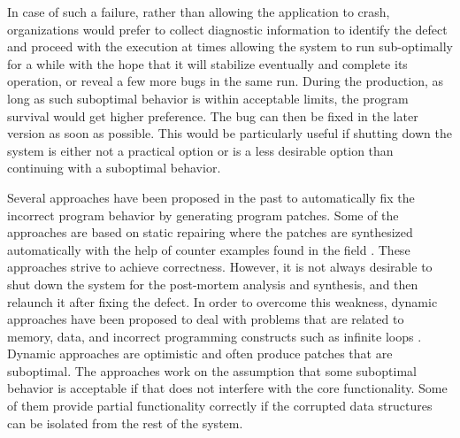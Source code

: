 In case of such a failure, rather than allowing the application to crash, organizations would
prefer to collect diagnostic information to identify the defect and proceed with the execution at times
allowing the system to run sub-optimally for a while with the hope that it will stabilize eventually and complete its operation, or 
reveal a few more bugs in the same run. During the production, as long as such suboptimal
behavior is within acceptable limits, the program survival would get higher preference. The bug can then be
fixed in the later version as soon as possible. This would be particularly useful if shutting down the system is
either not a practical option or is a less desirable option than continuing with a suboptimal behavior.


Several approaches have been proposed in the past to automatically fix the incorrect program behavior by generating program patches.
Some of the approaches are based on static repairing
where the patches are synthesized automatically with the help of counter examples
found in the field \cite{wei-issta-2010}. These approaches strive to achieve correctness.
However, it is not always desirable to shut down the system for the post-mortem analysis and synthesis, and then relaunch it
after fixing the defect. In order to overcome this weakness,
dynamic approaches have been proposed to deal with problems that are
related to memory, data, and incorrect programming constructs such as infinite
loops \cite{Carbin:2011, KlingMCR12, conf/sosp/PerkinsKLABCPSSSWZER09}.
Dynamic approaches are optimistic and often produce patches that are suboptimal.
The approaches work on the
assumption that some suboptimal behavior is acceptable if that does not
interfere with the core functionality. Some of them provide
partial functionality correctly if the corrupted data structures can be isolated from the rest of the system.


